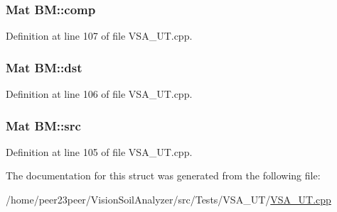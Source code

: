 \subsubsection[{comp}]{\setlength{\rightskip}{0pt plus 5cm}Mat B\+M\+::comp}\label{struct_b_m_a91a2c5f22e9d50eef5fb7447d986e081}


Definition at line 107 of file V\+S\+A\+\_\+\+U\+T.\+cpp.

\hypertarget{struct_b_m_a5dcd272086f1e23ec2c205a902dca28d}{}
\subsubsection[{dst}]{\setlength{\rightskip}{0pt plus 5cm}Mat B\+M\+::dst}\label{struct_b_m_a5dcd272086f1e23ec2c205a902dca28d}


Definition at line 106 of file V\+S\+A\+\_\+\+U\+T.\+cpp.

\hypertarget{struct_b_m_a16e469d839cd52f63a935fb65d5f2f37}{}
\subsubsection[{src}]{\setlength{\rightskip}{0pt plus 5cm}Mat B\+M\+::src}\label{struct_b_m_a16e469d839cd52f63a935fb65d5f2f37}


Definition at line 105 of file V\+S\+A\+\_\+\+U\+T.\+cpp.



The documentation for this struct was generated from the following file\+:\begin{DoxyCompactItemize}
\item 
/home/peer23peer/\+Vision\+Soil\+Analyzer/src/\+Tests/\+V\+S\+A\+\_\+\+U\+T/\hyperlink{_v_s_a___u_t_8cpp}{V\+S\+A\+\_\+\+U\+T.\+cpp}\end{DoxyCompactItemize}
